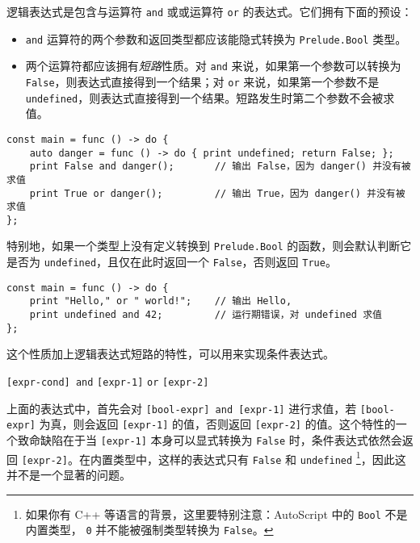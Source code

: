 逻辑表达式是包含与运算符 \lstinline!and! 或或运算符 \lstinline!or! 的表达式。它们拥有下面的预设：

\begin{itemize}
	\item \lstinline!and! 运算符的两个参数和返回类型都应该能隐式转换为 \lstinline!Prelude.Bool! 类型。

    \item 两个运算符都应该拥有\emph{短路}性质。对 \lstinline!and! 来说，如果第一个参数可以转换为 \lstinline!False!，则表达式直接得到一个结果；对 \lstinline!or! 来说，如果第一个参数不是 \lstinline!undefined!，则表达式直接得到一个结果。短路发生时第二个参数不会被求值。
\end{itemize}

\begin{lstlisting}
const main = func () -> do {
	auto danger = func () -> do { print undefined; return False; };
    print False and danger();		// 输出 False，因为 danger() 并没有被求值
    print True or danger();			// 输出 True，因为 danger() 并没有被求值
};
\end{lstlisting}

特别地，如果一个类型上没有定义转换到 \lstinline!Prelude.Bool! 的函数，则会默认判断它是否为 \lstinline!undefined!，且仅在此时返回一个 \lstinline!False!，否则返回 \lstinline!True!。

\begin{lstlisting}
const main = func () -> do {
	print "Hello," or " world!";	// 输出 Hello,
	print undefined and 42;			// 运行期错误，对 undefined 求值
};
\end{lstlisting}

这个性质加上逻辑表达式短路的特性，可以用来实现条件表达式。

\begin{grammar} \label{grm:conditional-expression}
    \lstinline![expr-cond] and! \texttt{[expr-1]} \lstinline!or! \texttt{[expr-2]}
\end{grammar}

上面的表达式中，首先会对 \lstinline![bool-expr] and [expr-1]! 进行求值，若 \lstinline![bool-expr]! 为真，则会返回 \lstinline![expr-1]! 的值，否则返回 \lstinline![expr-2]! 的值。这个特性的一个致命缺陷在于当 \lstinline![expr-1]! 本身可以显式转换为 \lstinline!False! 时，条件表达式依然会返回 \lstinline![expr-2]!。在内置类型中，这样的表达式只有 \lstinline!False! 和 \lstinline!undefined! \footnote{如果你有 C++ 等语言的背景，这里要特别注意：AutoScript 中的 \lstinline!Bool! 不是内置类型， \lstinline!0! 并不能被强制类型转换为 \lstinline!False!。}，因此这并不是一个显著的问题。


